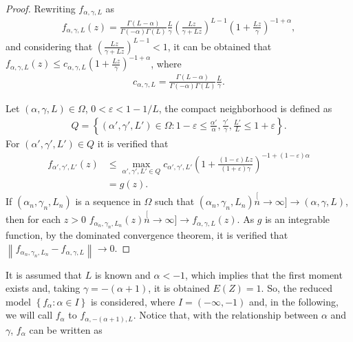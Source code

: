 \documentclass[journal]{IEEEtran}
\numberwithin{equation}{section}
\newenvironment{dem}[1][Proof]{\begin{proof}[{\it #1}]}{\end{proof}}
\newcommand{\norm}[1]{\ensuremath{\left\| #1 \right\|}}
\newcommand{\pa}[1]{\ensuremath{\left( #1 \right)}}
\newcommand{\set}[1]{\ensuremath{\left\{ #1 \right\}}}
\begin{document}
\begin{dem}
	Rewriting $f_{\alpha,\gamma,L}$ as
	\begin{align*}
	f_{\alpha,\gamma,L}\pa{z}= \frac{\Gamma\pa{L-\alpha}}{\Gamma\pa{-\alpha}\Gamma\pa{L}}
	\frac{L}{\gamma}\pa{\frac{Lz}{\gamma+Lz}}^{L-1}
	\pa{1+\frac{Lz}{\gamma}}^{-1+\alpha},
	\end{align*}
	and considering that $\pa{\frac{Lz}{\gamma+Lz}}^{L-1}<1$, it can be obtained that
	$f_{\alpha,\gamma,L}\pa{z} \le c_{\alpha,\gamma,L} \pa{1+\frac{Lz}{\gamma}}^{-1+\alpha}$, where
	\begin{align*}
	c_{\alpha,\gamma,L} = \frac{\Gamma\pa{L-\alpha}}{\Gamma\pa{-\alpha}\Gamma\pa{L}}
	\frac{L}{\gamma}.
	\end{align*}
	
	Let $\pa{\alpha,\gamma,L}\in\Omega$, $0<\varepsilon<1-1/L$, 
	the compact neighborhood is defined as
	\begin{align*}
	Q=\set{\pa{\alpha',\gamma',L'}\in\Omega:
		1-\varepsilon\le \textstyle{\frac{\alpha'}{\alpha},\frac{\gamma'}{\gamma},\frac{L'}{L}} \le 1+\varepsilon}.
	\end{align*}
	For $\pa{\alpha',\gamma',L'}\in Q$ it is verified that %
	\begin{align*}
	f_{\alpha',\gamma',L'}\pa{z} 
	&\le \max\limits_{{\alpha',\gamma',L'}\in Q}c_{\alpha',\gamma',L'}
	\pa{1+\frac{\pa{1-\varepsilon}Lz}{\pa{1+\varepsilon}\gamma}}^{-1+\pa{1-\varepsilon}\alpha} \\
	&= g\pa{z}.
	\end{align*}
	If $\pa{\alpha_{n},\gamma_{n},L_{n}}$ is a sequence in $\Omega$ such that $\pa{\alpha_{n},\gamma_{n},L_{n}}\stackrel[n\to\infty]{}{\longrightarrow}\pa{\alpha,\gamma,L}$, then for each $z>0$
	$f_{\alpha_{n},\gamma_{n},L_{n}}\pa{z}\stackrel[n\to\infty]{}{\longrightarrow} f_{\alpha,\gamma,L}\pa{z}$.
	As $g$ is an integrable function, by the dominated convergence theorem, it is verified that
	$\norm{f_{\alpha_{n},\gamma_{n},L_{n}} - f_{\alpha,\gamma,L}}\to 0$.
\end{dem}



It is assumed that  $L$ is known and $\alpha<-1$, which implies that the first moment exists and, 
taking $\gamma = -\pa{\alpha+1}$, it is obtained $E(Z) = 1$.
So, the reduced model $\set{f_{\alpha}:\alpha\in I}$ is considered,
where $I = \pa{-\infty,-1}\label{I}$ and, in the following, we will call $f_{\alpha}$ to $f_{\alpha,-\pa{\alpha+1},L}$.
Notice that, with the relationship between $\alpha$ and $\gamma$, $f_{\alpha}$ can be written as
\end{document}
